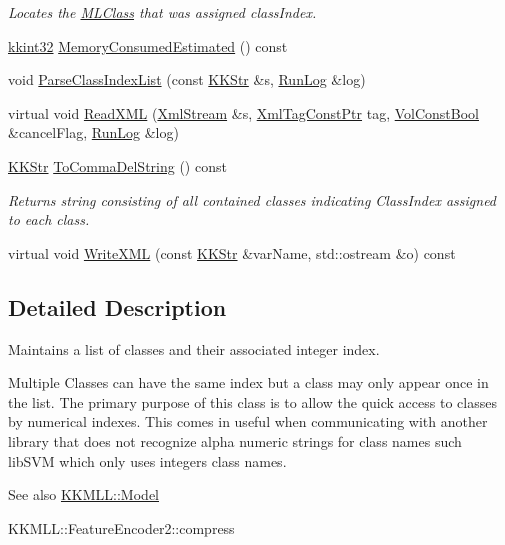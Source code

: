 \begin{DoxyCompactItemize}
\begin{DoxyCompactList}\small\item\em Locates the \hyperlink{class_k_k_m_l_l_1_1_m_l_class}{M\+L\+Class} that was assigned class\+Index. \end{DoxyCompactList}\item 
\hyperlink{namespace_k_k_b_a8fa4952cc84fda1de4bec1fbdd8d5b1b}{kkint32} \hyperlink{class_k_k_m_l_l_1_1_m_l_class_index_list_a89fab799659d7e75f53cd9daf742af8f}{Memory\+Consumed\+Estimated} () const 
\item 
void \hyperlink{class_k_k_m_l_l_1_1_m_l_class_index_list_ad154bf8d29ed4bbf4af96543b56fcac0}{Parse\+Class\+Index\+List} (const \hyperlink{class_k_k_b_1_1_k_k_str}{K\+K\+Str} \&s, \hyperlink{class_k_k_b_1_1_run_log}{Run\+Log} \&log)
\item 
virtual void \hyperlink{class_k_k_m_l_l_1_1_m_l_class_index_list_a76929745babde80f043d74a404e5dfe5}{Read\+X\+ML} (\hyperlink{class_k_k_b_1_1_xml_stream}{Xml\+Stream} \&s, \hyperlink{namespace_k_k_b_a5f1b0b1667d79fec26deeff10c43df23}{Xml\+Tag\+Const\+Ptr} tag, \hyperlink{namespace_k_k_b_a7d390f568e2831fb76b86b56c87bf92f}{Vol\+Const\+Bool} \&cancel\+Flag, \hyperlink{class_k_k_b_1_1_run_log}{Run\+Log} \&log)
\item 
\hyperlink{class_k_k_b_1_1_k_k_str}{K\+K\+Str} \hyperlink{class_k_k_m_l_l_1_1_m_l_class_index_list_a26ea89aa7723fdfd60aed3dbead28f8f}{To\+Comma\+Del\+String} () const 
\begin{DoxyCompactList}\small\item\em Returns string consisting of all contained classes indicating Class\+Index assigned to each class. \end{DoxyCompactList}\item 
virtual void \hyperlink{class_k_k_m_l_l_1_1_m_l_class_index_list_a85470064b287f5b8ad04a4c4c4b4784a}{Write\+X\+ML} (const \hyperlink{class_k_k_b_1_1_k_k_str}{K\+K\+Str} \&var\+Name, std\+::ostream \&o) const 
\end{DoxyCompactItemize}


\subsection{Detailed Description}
Maintains a list of classes and their associated integer index. 

Multiple Classes can have the same index but a class may only appear once in the list. The primary purpose of this class is to allow the quick access to classes by numerical indexes. This comes in useful when communicating with another library that does not recognize alpha numeric strings for class names such lib\+S\+VM which only uses integers class names. \begin{DoxySeeAlso}{See also}
\hyperlink{class_k_k_m_l_l_1_1_model}{K\+K\+M\+L\+L\+::\+Model} 

K\+K\+M\+L\+L\+::\+Feature\+Encoder2\+::compress 
\end{DoxySeeAlso}


